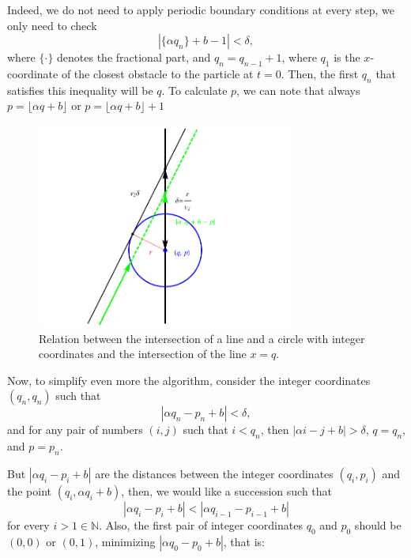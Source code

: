 \documentclass[prl,amsmath,amssymb, twocolumn, showpacs]{revtex4-1}
\begin{document}
Indeed, we do not need to apply periodic boundary conditions at every step, we only need to check 
\begin{equation}
|\{ \alpha  q_n \}+b -1|< \delta, 
\label{eq:master}
\end{equation}
where $\{ \cdot \}$ denotes the fractional part, and $q_n=q_{n-1}+1$, where $q_1$ is the $x$-coordinate of the closest obstacle to the particle at $t=0$. Then, the first $q_n$ that satisfies this inequality will be $q$. To calculate $p$, we can note that always $p=\lfloor \alpha q +b\rfloor$ or $p=\lfloor \alpha q +b\rfloor+1$

\begin{figure}
\centering
\includegraphics [width=240pt]{fig01.pdf}
\caption{Relation between the intersection of a line and a circle with integer coordinates and the intersection of the line $x = q$. }
\label{fig:circle}
\end{figure}


Now, to simplify even more the algorithm, consider the integer coordinates $(q_n, q_n)$ such that
\begin{equation}
|\alpha q_n -p_n + b|< \delta,
\label{eq:1}
\end{equation}
and for any pair of numbers $(i,j)$ such that $i<q_n$, then $|\alpha i -j+ b|> \delta$,  $q=q_n$, and $p=p_n$. 
 
But $|\alpha q_i - p_i + b|$ are the distances between the integer coordinates $(q_i, p_i)$ and the point $( q_i ,\alpha q_i + b)$, then, we would like a succession such that  
\begin{equation}
|\alpha q_i - p_i + b|<|\alpha q_{i-1} - p_{i-1} + b|
\label{eq:iteration}
\end{equation}
for every $i>1 \in   \mathbb{N}$. Also, the first pair of integer coordinates $q_0$ and $p_0$ should be $(0, 0)$ or $(0, 1)$, minimizing $|\alpha q_0 - p_0 + b|$, that is:
\end{document}

